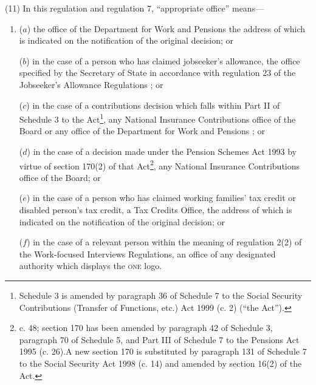 \documentclass[12pt,a4paper]{article}
\begin{document}
(11) In this regulation and regulation 7, “appropriate office” means---
\begin{enumerate}\item[]
($a$) the office of the 
Department for Work and Pensions  %
the address of which is indicated on the notification of the original decision; or

($b$) in the case of a person who has claimed jobseeker’s allowance, the office specified by the Secretary of State in accordance with regulation 23 of the Jobseeker’s Allowance Regulations%
; or

    ($c$) 
    in the case of a contributions decision which falls within Part II of Schedule 3 to the Act\footnote{\frenchspacing Schedule 3 is amended by paragraph 36 of Schedule 7 to the Social Security Contributions (Transfer of Functions, etc.) Act 1999 (c. 2) (“the Act”).}, any National Insurance Contributions office of the Board or any office of the 
Department for Work and Pensions%
; or

    ($d$) 
    in the case of a decision made under the Pension Schemes Act 1993 by virtue of section 170(2) of that Act\footnote{ c. 48; section 170 has been amended by paragraph 42 of Schedule 3, paragraph 70 of Schedule 5, and Part III of Schedule 7 to the Pensions Act 1995 (c. 26).\@ A new section 170 is substituted by paragraph 131 of Schedule 7 to the Social Security Act 1998 (c. 14) and amended by section 16(2) of the Act.}, any National Insurance Contributions office of the Board;
or

($e$) in the case of a person who has claimed working families' tax credit or disabled person’s tax credit, a Tax Credits Office, the address of which is indicated on the notification of the original decision;
or

($f$) in the case of a relevant person within the meaning of regulation 2(2) of the Work-focused Interviews Regulations, an office of any designated authority which displays the \textsc{\lowercase{ONE}} logo.
\end{enumerate}
\end{document}
